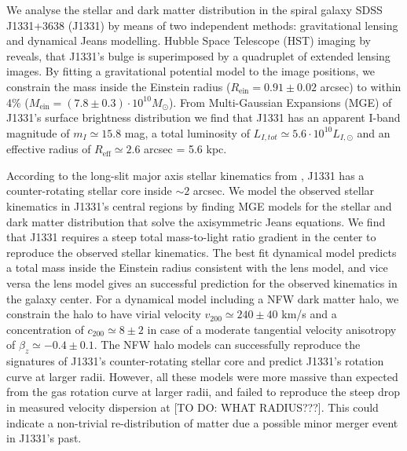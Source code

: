 We analyse the stellar and dark matter distribution in the spiral galaxy SDSS J1331+3638 (J1331) by means of two independent methods: gravitational lensing and dynamical Jeans modelling. Hubble Space Telescope (HST) imaging by \citet{SWELLSI} reveals, that J1331's bulge is superimposed by a quadruplet of extended lensing images. By fitting a gravitational potential model to the image positions, we constrain the mass inside the Einstein radius ($R_\text{ein}=0.91\pm0.02$ arcsec) to within 4\% ($M_\text{ein} = (7.8\pm0.3) \cdot 10^{10} M_\odot$). From Multi-Gaussian Expansions (MGE) of J1331's surface brightness distribution we find that J1331 has an apparent I-band magnitude of $m_I \simeq 15.8$ mag, a total luminosity of $L_{I,tot} \simeq 5.6 \cdot 10^{10}L_{I,\odot}$ and an effective radius of $R_\text{eff} \simeq 2.6$ arcsec = 5.6 kpc.

According to the long-slit major axis stellar kinematics from \citet{SWELLSV}, J1331 has a counter-rotating stellar core inside $\sim 2$ arcsec. We model the observed stellar kinematics in J1331's central regions by finding MGE models for the stellar and dark matter distribution that solve the axisymmetric Jeans equations. We find that J1331 requires a steep total mass-to-light ratio gradient in the center to reproduce the observed stellar kinematics. The best fit dynamical model predicts a total mass inside the Einstein radius consistent with the lens model, and vice versa the lens model gives an successful prediction for the observed kinematics in the galaxy center. For a dynamical model including a NFW dark matter halo,  we constrain the halo to have virial velocity $v_{200} \simeq 240 \pm 40$ km/s and a concentration of $c_{200} \simeq 8 \pm 2$ in case of a moderate tangential velocity anisotropy of $\beta_z \simeq −0.4 \pm 0.1$. The NFW halo models can successfully reproduce the signatures of J1331's counter-rotating stellar core and predict J1331's rotation curve at larger radii. However, all these models were more massive than expected from the gas rotation curve at larger radii, and failed to reproduce the steep drop in measured velocity dispersion at [TO DO: WHAT RADIUS???]. This could indicate a non-trivial re-distribution of matter due a possible minor merger event in J1331's past.